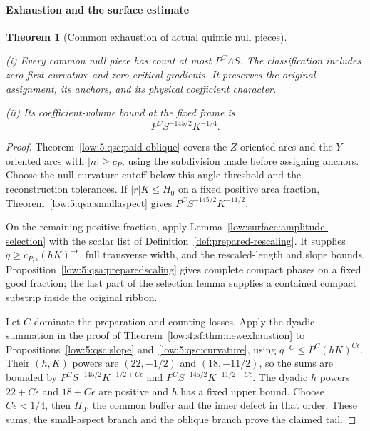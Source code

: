\documentclass[11pt]{amsart}
\newtheorem{theorem}{Theorem}[section]
\theoremstyle{definition}
\theoremstyle{remark}
\numberwithin{equation}{section}
\begin{document}
\paragraph{Exhaustion and the surface estimate}
\begin{theorem}[Common exhaustion of actual quintic null pieces]\label{low:5:qsc:null-exhaustion}

\noindent\textup{(i)} Every common null piece has count at most $P^C\Lambda S$. The classification includes zero first curvature and zero critical gradients. It preserves the original assignment, its anchors, and its physical coefficient character.

\noindent\textup{(ii)} Its coefficient-volume bound at the fixed frame is
\[
 \boxed{\qquad P^CS^{-145/2}K^{-1/4}.\qquad}
\]
\end{theorem}
\begin{proof}
Theorem~\ref{low:5:qsc:paid-oblique} covers the $Z$-oriented arcs and the $Y$-oriented arcs with $|n|\ge c_P$, using the subdivision made before assigning anchors. Choose the null curvature cutoff below this angle threshold and the reconstruction tolerances. If $|r|K\le H_0$ on a fixed positive area fraction, Theorem~\ref{low:5:qsa:smallaspect} gives $P^CS^{-145/2}K^{-11/2}$.

On the remaining positive fraction, apply Lemma~\ref{low:surface:amplitude-selection} with the scalar list of Definition~\ref{def:prepared-rescaling}. It supplies $q\ge c_{P,\epsilon}(hK)^{-\epsilon}$, full transverse width, and the rescaled-length and slope bounds. Proposition~\ref{low:5:qsa:preparedscaling} gives complete compact phases on a fixed good fraction; the last part of the selection lemma supplies a contained compact substrip inside the original ribbon.

Let $C$ dominate the preparation and counting losses. Apply the dyadic summation in the proof of Theorem~\ref{low:4:sf:thm:newexhaustion} to Propositions~\ref{low:5:qsc:slope} and~\ref{low:5:qsc:curvature}, using $q^{-C}\le P^C(hK)^{C\epsilon}$. Their $(h,K)$ powers are $(22,-1/2)$ and $(18,-11/2)$, so the sums are bounded by $P^CS^{-145/2}K^{-1/2+C\epsilon}$ and $P^CS^{-145/2}K^{-11/2+C\epsilon}$. The dyadic $h$ powers $22+C\epsilon$ and $18+C\epsilon$ are positive and $h$ has a fixed upper bound. Choose $C\epsilon<1/4$, then $H_0$, the common buffer and the inner defect in that order. These sums, the small-aspect branch and the oblique branch prove the claimed tail.
\end{proof}
\end{document}
